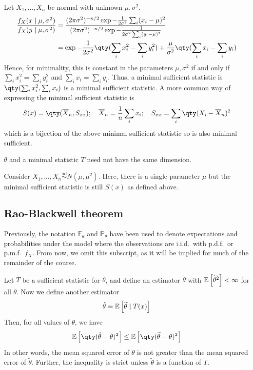 \begin{example}
	Let $X_1, \dots, X_n$ be normal with unknown $\mu, \sigma^2$.
	\begin{align*}
		\frac{f_X(x \mid \mu, \sigma^2)}{f_X(y \mid \mu, \sigma^2)} & = \frac{(2 \pi \sigma^2)^{-n/2} \exp{-\frac{1}{2\sigma^2} \sum_i (x_i - \mu)^2}}{(2 \pi \sigma^2)^{-n/2} \exp{-\frac{1}{2\sigma^2 \sum_i (y_i - \mu)^2}}} \\
		& = \exp{-\frac{1}{2\sigma^2} \qty(\sum_i x_i^2 - \sum_i y_i^2) + \frac{\mu}{\sigma^2} \qty(\sum_i x_i - \sum_i y_i)}
	\end{align*}
	Hence, for minimality, this is constant in the parameters $\mu, \sigma^2$ if and only if $\sum_i x_i^2 = \sum_i y_i^2$ and $\sum_i x_i = \sum_i y_i$.
	Thus, a minimal sufficient statistic is $\qty(\sum_i x_i^2, \sum_i x_i)$ is a minimal sufficient statistic.
	A more common way of expressing the minimal sufficient statistic is
	\begin{align*}
		S(x) = \qty(\overline X_n, S_{xx});\quad \overline X_n = \frac{1}{n} \sum_i x_i;\quad S_{xx} = \sum_i \qty(X_i - \overline X_n)^2
	\end{align*}
	which is a bijection of the above minimal sufficient statistic so is also minimal sufficient.
\end{example}

\begin{remark}
	$\theta$ and a minimal statistic $T$ need not have the same dimension.
\end{remark} 

\begin{example}
	Consider $X_1, \dots, X_n \overset{\text{iid}}{\sim} N(\mu, \mu^2)$. 
	Here, there is a single parameter $\mu$ but the minimal sufficient statistic is still $S(x)$ as defined above.
\end{example}

\subsection{Rao-Blackwell theorem}
Previously, the notation $\mathbb E_\theta$ and $\mathbb P_\theta$ have been used to denote expectations and probabilities under the model where the observations are i.i.d.\ with p.d.f.\ or p.m.f.\ $f_X$.
From now, we omit this subscript, as it will be implied for much of the remainder of the course.
\begin{theorem}
	Let $T$ be a sufficient statistic for $\theta$, and define an estimator $\widetilde \theta$ with $\mathbb{E}\left[{{\widetilde \theta}^2}\right] < \infty$ for all $\theta$.
	Now we define another estimator
	\begin{align*}
		\hat \theta = \mathbb{E}\left[{\widetilde \theta \mid T(x)}\right]
	\end{align*}
	Then, for all values of $\theta$, we have
	\begin{align*}
		\expect{\qty(\hat \theta - \theta)^2} \leq \expect{\qty(\widetilde \theta - \theta)^2}
	\end{align*}
	In other words, the mean squared error of $\hat \theta$ is not greater than the mean squared error of $\widetilde \theta$.
	Further, the inequality is strict unless $\widetilde \theta$ is a function of $T$.
\end{theorem}

